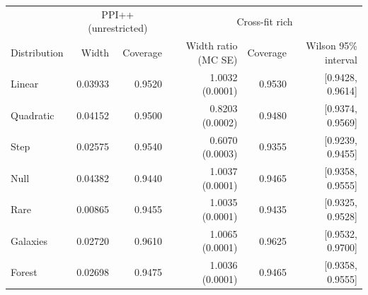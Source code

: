 \begin{tabular}{lrrrrr}
\toprule
 & \multicolumn{2}{c}{PPI++ (unrestricted)} & \multicolumn{3}{c}{Cross-fit rich} \\
Distribution & Width & Coverage & Width ratio (MC SE) & Coverage & Wilson 95\% interval \\
\midrule
Linear & 0.03933 & 0.9520 & 1.0032 (0.0001) & 0.9530 & [0.9428, 0.9614] \\
Quadratic & 0.04152 & 0.9500 & 0.8203 (0.0002) & 0.9480 & [0.9374, 0.9569] \\
Step & 0.02575 & 0.9540 & 0.6070 (0.0003) & 0.9355 & [0.9239, 0.9455] \\
Null & 0.04382 & 0.9440 & 1.0037 (0.0001) & 0.9465 & [0.9358, 0.9555] \\
Rare & 0.00865 & 0.9455 & 1.0035 (0.0001) & 0.9435 & [0.9325, 0.9528] \\
Galaxies & 0.02720 & 0.9610 & 1.0065 (0.0001) & 0.9625 & [0.9532, 0.9700] \\
Forest & 0.02698 & 0.9475 & 1.0036 (0.0001) & 0.9465 & [0.9358, 0.9555] \\
\bottomrule
\end{tabular}
